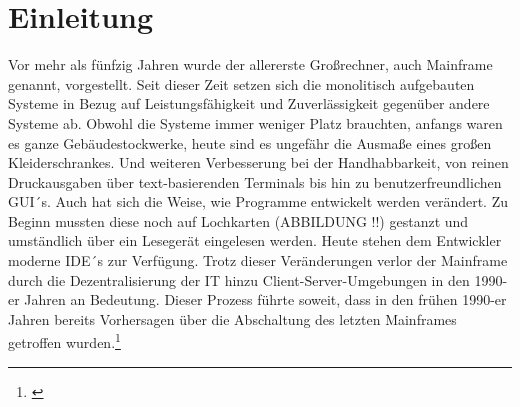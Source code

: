 \chapter{Einleitung}\label{ch:einleitung}
Vor mehr als fünfzig Jahren wurde der allererste Großrechner, auch Mainframe genannt, vorgestellt.
Seit dieser Zeit setzen sich die monolitisch aufgebauten Systeme in Bezug auf Leistungsfähigkeit und Zuverlässigkeit gegenüber andere Systeme ab.
Obwohl die Systeme immer weniger Platz brauchten, anfangs waren es ganze Gebäudestockwerke, heute sind es ungefähr die Ausmaße eines großen Kleiderschrankes.
Und weiteren Verbesserung bei der Handhabbarkeit, von reinen Druckausgaben über text-basierenden Terminals bis hin zu benutzerfreundlichen GUI´s.
Auch hat sich die Weise, wie Programme entwickelt werden verändert.
Zu Beginn mussten diese noch auf Lochkarten (ABBILDUNG !!) gestanzt und umständlich über ein Lesegerät eingelesen werden.
Heute stehen dem Entwickler moderne IDE´s zur Verfügung.
Trotz dieser Veränderungen verlor der Mainframe durch die Dezentralisierung der IT hinzu Client-Server-Umgebungen in den 1990-er Jahren an Bedeutung.
Dieser Prozess führte soweit, dass in den frühen 1990-er Jahren bereits Vorhersagen über die Abschaltung des letzten Mainframes getroffen wurden.\footnote{\cite{Alsop.1993}}
\cite{Ceruzzi.2003}

